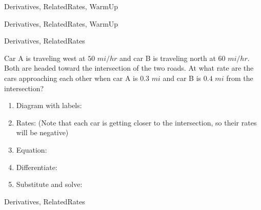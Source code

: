 \begin{tagblock}{Derivatives, RelatedRates, WarmUp}
\begin{question}
	
\begin{tags}
	    Derivatives, RelatedRates, WarmUp
\end{tags}
	
\begin{diary}
\end{diary}
	
\begin{solution}
	   
\end{solution}
	
\end{question}

\end{tagblock}



	
\begin{tagblock}{Derivatives, RelatedRates}
\begin{question}
	

Car A is traveling west at $50$ $mi/hr$ and car B is traveling north at $60$ $mi/hr$. Both are headed toward the intersection of the two roads. At what rate are the cars approaching each other when car A is $0.3$ $mi$ and car B is $0.4$ $mi$ from the intersection?
 \begin{enumerate}
 \item Diagram with labels:
 \vspace{1.5in}
 \item Rates: (Note that each car is getting closer to the intersection, so their rates will be negative)
 \vspace{1in}
 \item Equation:
 \vspace{1in}
 \item Differentiate:
 \vspace{1.5in}
 \item Substitute and solve:
 \vspace{2in}
\end{enumerate}




	
\begin{tags}
	    Derivatives, RelatedRates
\end{tags}
	
\begin{diary}
\end{diary}
	
\begin{solution}
	   
\end{solution}
	
\end{question}

\end{tagblock}

